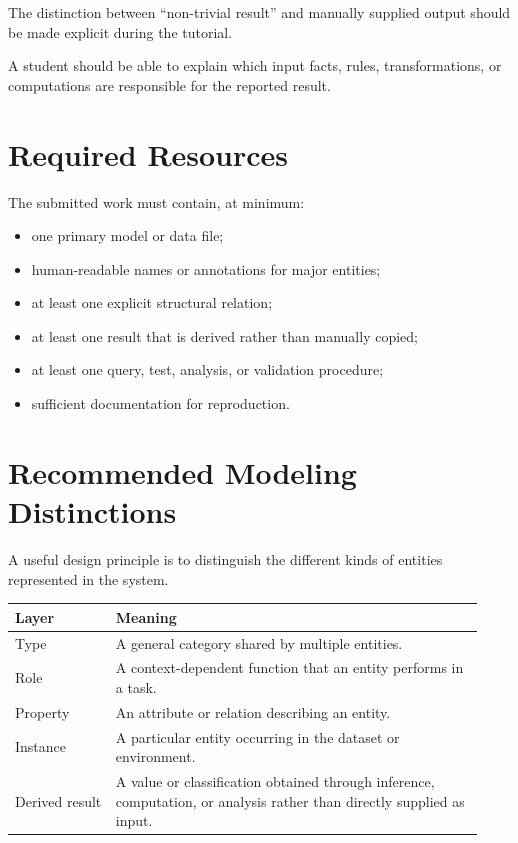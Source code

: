 \documentclass[11pt]{article}
\begin{document}
\begin{tutornote}
The distinction between ``non-trivial result'' and manually supplied output
should be made explicit during the tutorial.

A student should be able to explain which input facts, rules, transformations,
or computations are responsible for the reported result.
\end{tutornote}

\section{Required Resources}

The submitted work must contain, at minimum:

\begin{itemize}
    \item one primary model or data file;
    \item human-readable names or annotations for major entities;
    \item at least one explicit structural relation;
    \item at least one result that is derived rather than manually copied;
    \item at least one query, test, analysis, or validation procedure;
    \item sufficient documentation for reproduction.
\end{itemize}

\section{Recommended Modeling Distinctions}

A useful design principle is to distinguish the different kinds of entities
represented in the system.

{\renewcommand{\arraystretch}{1.25}
\begin{longtable}{L{0.20\linewidth}L{0.73\linewidth}}
\toprule
\textbf{Layer} & \textbf{Meaning} \\
\midrule

Type &
A general category shared by multiple entities. \\

Role &
A context-dependent function that an entity performs in a task. \\

Property &
An attribute or relation describing an entity. \\

Instance &
A particular entity occurring in the dataset or environment. \\

Derived result &
A value or classification obtained through inference, computation, or
analysis rather than directly supplied as input. \\

\bottomrule
\end{longtable}
}
\end{document}
